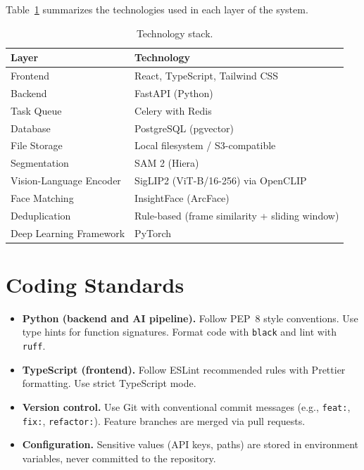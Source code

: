 Table~\ref{tab:tech-stack} summarizes the technologies used in each layer of the system.

\begin{table}[H]
    \centering
    \begin{tabular}{ll}
        \toprule
        \textbf{Layer} & \textbf{Technology} \\
        \midrule
        Frontend & React, TypeScript, Tailwind CSS \\
        Backend & FastAPI (Python) \\
        Task Queue & Celery with Redis \\
        Database & PostgreSQL (pgvector) \\
        File Storage & Local filesystem / S3-compatible \\
        Segmentation & SAM 2 (Hiera) \\
        Vision-Language Encoder & SigLIP2 (ViT-B/16-256) via OpenCLIP \\
        Face Matching & InsightFace (ArcFace) \\
        Deduplication & Rule-based (frame similarity + sliding window) \\
        Deep Learning Framework & PyTorch \\
        \bottomrule
    \end{tabular}
    \caption{Technology stack.}
    \label{tab:tech-stack}
\end{table}

\section{Coding Standards}
\label{section:coding-standards}

\begin{itemize}
    \item \textbf{Python (backend and AI pipeline).} Follow PEP~8 style conventions. Use type hints for function signatures. Format code with \texttt{black} and lint with \texttt{ruff}.
    \item \textbf{TypeScript (frontend).} Follow ESLint recommended rules with Prettier formatting. Use strict TypeScript mode.
    \item \textbf{Version control.} Use Git with conventional commit messages (e.g., \texttt{feat:}, \texttt{fix:}, \texttt{refactor:}). Feature branches are merged via pull requests.
    \item \textbf{Configuration.} Sensitive values (API keys, paths) are stored in environment variables, never committed to the repository.
\end{itemize}

